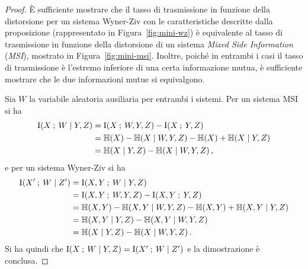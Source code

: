 \begin{proof}
    È sufficiente mostrare che il tasso di trasmissione in funzione della
    distorsione per un sistema Wyner-Ziv con le caratteristiche descritte dalla
    proposizione (rappresentato in Figura~\ref{fig:mini-wz}) è equivalente al
    tasso di trasmissione in funzione della distorsione di un sistema
    \textit{Mixed Side Information} (\textit{MSI}), mostrato in
    Figura~\ref{fig:mini-msi}. Inoltre, poiché in entrambi i casi il tasso di
    trasmissione è l'estremo inferiore di una certa informazione mutua, è
    sufficiente mostrare che le due informazioni mutue si equivalgono.

    Sia \(W\) la variabile aleatoria ausiliaria per entrambi i sistemi. Per un
    sistema MSI si ha
    \begin{equation}
        \begin{aligned}
            \mutual{X}{W \given Y,Z} &= \mutual{X}{W,Y,Z} - \mutual{X}{Y,Z} \\
            &= \entropy{X} - \entropy{X \given W,Y,Z} - \entropy{X} + \entropy{X \given Y,Z} \\
            &= \entropy{X \given Y,Z} - \entropy{X \given W,Y,Z} \,,
        \end{aligned}
    \end{equation}
    e per un sistema Wyner-Ziv si ha
    \begin{equation}
        \begin{aligned}
            \mutual{X'}{W \given Z'} &= \mutual{X,Y}{W \given Y,Z} \\
            &= \mutual{X,Y}{W,Y,Z} - \mutual{X,Y}{Y,Z}\\
            &= \entropy{X,Y} - \entropy{X,Y \given W,Y,Z} - \entropy{X,Y} + \entropy{X,Y \given Y,Z} \\
            &= \entropy{X,Y \given Y,Z} - \entropy{X,Y \given W,Y,Z} \\
            &= \entropy{X \given Y,Z} - \entropy{X \given W,Y,Z} \,.
        \end{aligned}
    \end{equation}
    Si ha quindi che \(\mutual{X}{W \given Y,Z} = \mutual{X'}{W \given Z'}\) e
    la dimostrazione è conclusa.
\end{proof}

